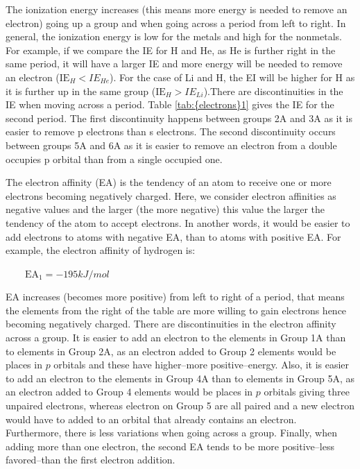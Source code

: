 \documentclass[main.tex]{subfiles}
\newcommand\chapterlabel{electrons}
\begin{document}
\begin{description}
 
The ionization energy increases (this means more energy is needed to remove an electron) going up a group and when going across a period from left to right. In general, the ionization energy is low for the metals and high for the nonmetals. For example, if we compare the IE for H and He, as He is further right in the same period, it will have a larger IE and more energy will be needed to remove an electron ($\text{IE}_{H}<IE_{He}$). For the case of Li and H, the EI will be higher for H as it is further up in the same group ($\text{IE}_{H}>IE_{Li}$).There are discontinuities in the IE when moving across a period. Table \ref{tab:{\chapterlabel}1} gives the IE for the second period. The first discontinuity happens between groups 2A and 3A as it is easier to remove p electrons than s electrons. The second discontinuity occurs between groups 5A and 6A as it is easier to remove an electron from a double occupies p orbital than from a single occupied one.
\item[\docfilehook{Electron affinity}{}] 
The electron affinity (EA) is the tendency of an atom to receive one or more electrons becoming negatively charged.  Here, we consider electron affinities as negative values and the larger (the more negative) this value the larger the tendency of the atom to accept electrons. In another words, it would be easier to add electrons to atoms with negative EA, than to atoms with positive EA. For example, the electron affinity of hydrogen is:
\begin{center} $\qquad   \text{EA}_1= -195kJ/mol$  \end{center}
EA increases (becomes more positive) from left to right of a period, that means the elements from the right of the table are more willing to gain electrons hence becoming negatively charged. There are discontinuities in the electron affinity across a group. It is easier to add an electron to the elements in Group 1A than to elements in Group 2A, as an electron added to Group 2 elements would be places in $p$ orbitals and these have higher--more positive--energy. Also, it is easier to add an electron to the elements in Group 4A than to elements in Group 5A, as an electron added to Group 4 elements would be places in $p$ orbitals giving three unpaired electrons, whereas electron on Group 5 are all paired and a new electron would have to added to an orbital that already contains an electron. Furthermore, there is less variations when going across a group. Finally, when adding more than one electron, the second EA tends to be more positive--less favored--than the first electron addition.


\end{description}
\end{document}
